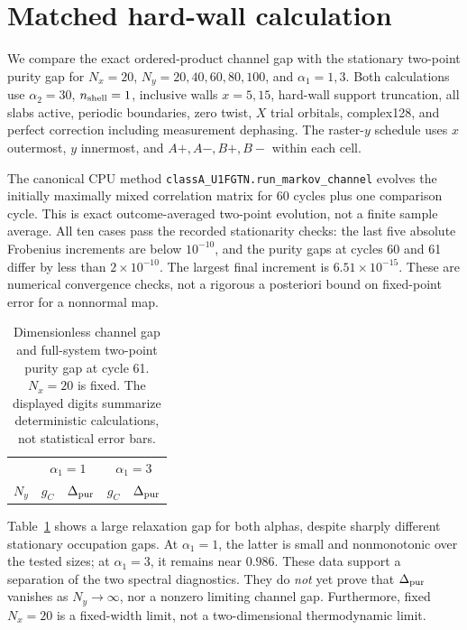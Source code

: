 \documentclass[aps,prb,twocolumn,nofootinbib,superscriptaddress]{revtex4-2}
\begin{document}
\section{Matched hard-wall calculation}
We compare the exact ordered-product channel gap with the stationary
two-point purity gap for $N_x=20$, $N_y=20,40,60,80,100$, and
$\alpha_1=1,3$. Both calculations use $\alpha_2=30$,
$n_{\rm shell}=1$, inclusive walls $x=5,15$, hard-wall support
truncation, all slabs active, periodic boundaries, zero twist, $X$ trial
orbitals, complex128, and perfect correction including measurement
dephasing. The raster-$y$ schedule uses $x$ outermost, $y$ innermost,
and $A+,A-,B+,B-$ within each cell.

The canonical CPU method
\texttt{classA\_U1FGTN.run\_markov\_channel} evolves the initially
maximally mixed correlation matrix for 60 cycles plus one comparison
cycle. This is exact outcome-averaged two-point evolution, not a finite
sample average. All ten cases pass the recorded stationarity checks:
the last five absolute Frobenius increments are below $10^{-10}$,
and the purity gaps at cycles 60 and 61 differ by less than
$2\times10^{-10}$. The largest final increment is
$6.51\times10^{-15}$. These are numerical convergence checks, not a
rigorous a posteriori bound on fixed-point error for a nonnormal map.

\begin{table}[t]
\caption{Dimensionless channel gap and full-system two-point purity gap
at cycle 61. $N_x=20$ is fixed. The displayed digits summarize
deterministic calculations, not statistical error bars.}
\label{tab:results}
\begin{ruledtabular}
\begin{tabular}{rcccc}
 &\multicolumn{2}{c}{$\alpha_1=1$}&\multicolumn{2}{c}{$\alpha_1=3$}\\
 $N_y$&$g_C$&$\Delta_{\rm pur}$&$g_C$&$\Delta_{\rm pur}$\\

\end{tabular}
\end{ruledtabular}
\end{table}

Table~\ref{tab:results} shows a large relaxation gap for both alphas,
despite sharply different stationary occupation gaps. At $\alpha_1=1$,
the latter is small and nonmonotonic over the tested sizes; at
$\alpha_1=3$, it remains near $0.986$. These data support a separation
of the two spectral diagnostics. They do \emph{not} yet prove that
$\Delta_{\rm pur}$ vanishes as $N_y\to\infty$, nor a nonzero limiting
channel gap. Furthermore, fixed $N_x=20$ is a fixed-width limit, not a
two-dimensional thermodynamic limit.
\end{document}
